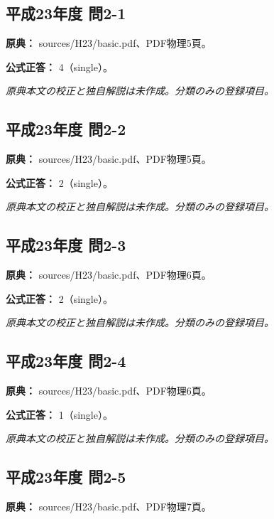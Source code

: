 \subsection{平成23年度 問2-1}
\label{q:h23-reg-basic-2-1}

\noindent\textbf{原典：} sources/H23/basic.pdf、PDF物理5頁。

\textbf{公式正答：} 4（single）。

\par\textit{原典本文の校正と独自解説は未作成。分類のみの登録項目。}

\subsection{平成23年度 問2-2}
\label{q:h23-reg-basic-2-2}

\noindent\textbf{原典：} sources/H23/basic.pdf、PDF物理5頁。

\textbf{公式正答：} 2（single）。

\par\textit{原典本文の校正と独自解説は未作成。分類のみの登録項目。}

\subsection{平成23年度 問2-3}
\label{q:h23-reg-basic-2-3}

\noindent\textbf{原典：} sources/H23/basic.pdf、PDF物理6頁。

\textbf{公式正答：} 2（single）。

\par\textit{原典本文の校正と独自解説は未作成。分類のみの登録項目。}

\subsection{平成23年度 問2-4}
\label{q:h23-reg-basic-2-4}

\noindent\textbf{原典：} sources/H23/basic.pdf、PDF物理6頁。

\textbf{公式正答：} 1（single）。

\par\textit{原典本文の校正と独自解説は未作成。分類のみの登録項目。}

\subsection{平成23年度 問2-5}
\label{q:h23-reg-basic-2-5}

\noindent\textbf{原典：} sources/H23/basic.pdf、PDF物理7頁。

